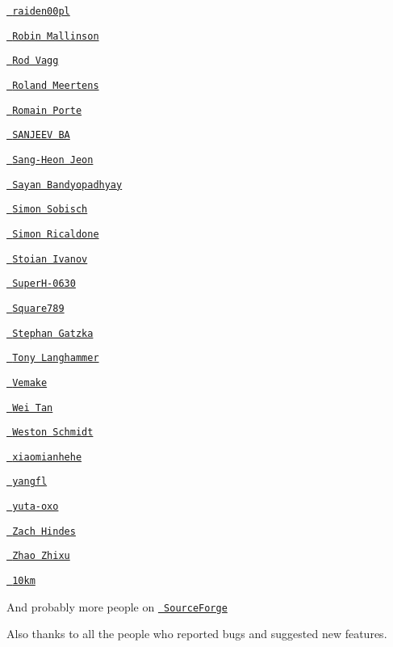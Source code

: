 \begin{DoxyItemize}
\item \href{https://github.com/raiden00pl}{\texttt{ raiden00pl}}
\item \href{https://github.com/rmallins}{\texttt{ Robin Mallinson}}
\item \href{https://github.com/rvagg}{\texttt{ Rod Vagg}}
\item \href{https://github.com/rmeertens}{\texttt{ Roland Meertens}}
\item \href{https://github.com/MicroJoe}{\texttt{ Romain Porte}}
\item \href{https://github.com/basanjeev}{\texttt{ SANJEEV BA}}
\item \href{https://github.com/lntuition}{\texttt{ Sang-\/\+Heon Jeon}}
\item \href{https://github.com/saynb}{\texttt{ Sayan Bandyopadhyay}}
\item \href{https://github.com/GitMensch}{\texttt{ Simon Sobisch}}
\item \href{https://github.com/simon-p-r}{\texttt{ Simon Ricaldone}}
\item \href{https://github.com/sdrsdr}{\texttt{ Stoian Ivanov}}
\item \href{https://github.com/SuperH-0630}{\texttt{ Super\+H-\/0630}}
\item \href{https://github.com/Square789}{\texttt{ Square789}}
\item \href{https://github.com/gatzka}{\texttt{ Stephan Gatzka}}
\item \href{https://github.com/BigBrainAFK}{\texttt{ Tony Langhammer}}
\item \href{https://github.com/vemakereporter}{\texttt{ Vemake}}
\item \href{https://github.com/tan-wei}{\texttt{ Wei Tan}}
\item \href{https://github.com/schmidtw}{\texttt{ Weston Schmidt}}
\item \href{https://github.com/xiaomianhehe}{\texttt{ xiaomianhehe}}
\item \href{https://github.com/yangfl}{\texttt{ yangfl}}
\item \href{https://github.com/yuta-oxo}{\texttt{ yuta-\/oxo}}
\item \href{https://github.com/zhindes}{\texttt{ Zach Hindes}}
\item \href{https://github.com/zhaozhixu}{\texttt{ Zhao Zhixu}}
\item \href{https://github.com/10km}{\texttt{ 10km}}
\end{DoxyItemize}

And probably more people on \href{https://sourceforge.net/p/cjson/bugs/search/?q=status\%3Aclosed-rejected+or+status\%3Aclosed-out-of-date+or+status\%3Awont-fix+or+status\%3Aclosed-fixed+or+status\%3Aclosed&page=0}{\texttt{ Source\+Forge}}

Also thanks to all the people who reported bugs and suggested new features. 
